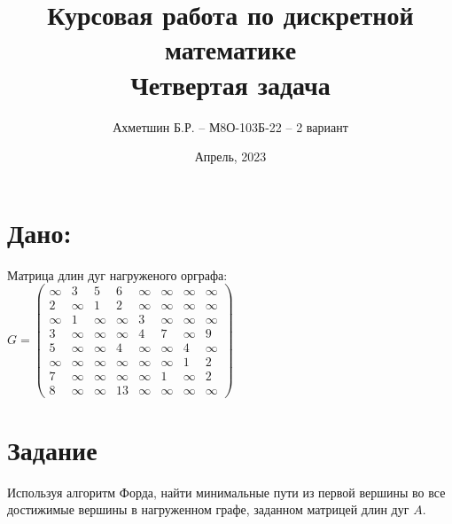\documentclass{article}
\title{Курсовая работа по дискретной математике\\Четвертая задача}
\author{Ахметшин Б.Р. -- М8О-103Б-22 -- 2 вариант}
\date{Апрель, 2023}
\let\inf\infty
\begin{document}
\maketitle

\section*{Дано:}
Матрица длин дуг нагруженого орграфа:\\

$
G = 
\begin{pmatrix}
  \inf	&	 3	&	 5	&	 6	&	 \inf	&	 \inf	&	 \inf	&	\inf	\\
  2	&	 \inf	&	 1	&	 2	&	 \inf	&	 \inf	&	 \inf	&	 \inf	\\
  \inf	&	 1	&	 \inf	&	 \inf	&	 3	&	 \inf	&	 \inf	&	 \inf	\\
  3	&	 \inf	&	 \inf	&	 \inf	&	 4	&	 7	&	 \inf	&	 9	\\
  5	&	 \inf	&	 \inf	&	 4	&	 \inf	&	 \inf	&	 4	&	 \inf	\\
  \inf	&	 \inf	&	 \inf	&	 \inf	&	 \inf	& \inf &	 1	&	 2	\\
  7	&	 \inf	&	 \inf	&	 \inf	&	 \inf	&	 1	&	 \inf	&	 2	\\
  8	&	 \inf	&	 \inf	&	 13	&	 \inf	&	 \inf	&	 \inf	&	 \inf	
\end{pmatrix}
$


\section*{Задание}
Используя алгоритм Форда, найти минимальные пути из первой вершины во
все достижимые вершины в нагруженном графе, заданном матрицей длин дуг $A$.
\end{document}
